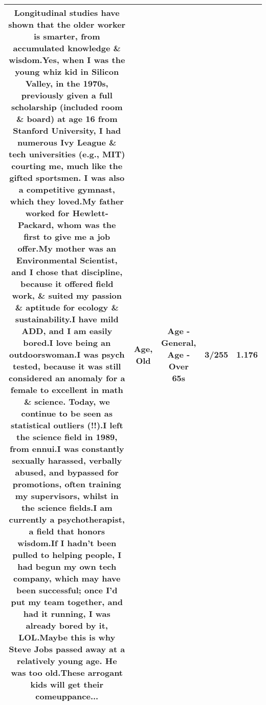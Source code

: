 \documentclass[11pt]{article}
\newlength\mylength
\begin{document}
\begin{center}
\begin{longtable}{|C{.65\mylength}|C{.30\mylength}|C{.12\mylength}|C{.12\mylength}|C{.12\mylength}|}
  \small Longitudinal studies have shown that the older worker is smarter, from accumulated knowledge \& wisdom.Yes, when I was the young whiz kid in Silicon Valley, in the 1970s, previously given a full scholarship (included room \& board) at \textbf{age} 16 from Stanford University, I had numerous Ivy League \& tech universities (e.g., MIT) courting me, much like the gifted sportsmen.  I was also a competitive gymnast, which they loved.My father worked for Hewlett-Packard, whom was the first to give me a job offer.My mother was an Environmental Scientist, and I chose that discipline, because it offered field work, \& suited my passion \& aptitude for ecology \& sustainability.I have mild ADD, and I am easily bored.I love being an outdoorswoman.I was psych tested, because it was still considered an anomaly for a female to excellent in math \& science.  Today, we continue to be seen as statistical outliers (!!).I left the science field in 1989, from ennui.I was constantly sexually harassed, verbally abused, and bypassed for promotions, often training my supervisors, whilst in the science fields.I am currently a psychotherapist, a field that honors wisdom.If I hadn't been pulled to helping people, I had begun my own tech company, which may have been successful; once I'd put my team together, and had it running, I was already bored by it, LOL.Maybe this is why Steve Jobs passed away at a relatively young \textbf{age}.  He was too \textbf{old}.These arrogant kids will get their comeuppance...\normalsize   & Age, Old & Age - General, Age - Over 65s & 3/255 & 1.176 \\  \hline

\end{longtable}
\end{center}
\end{document}
